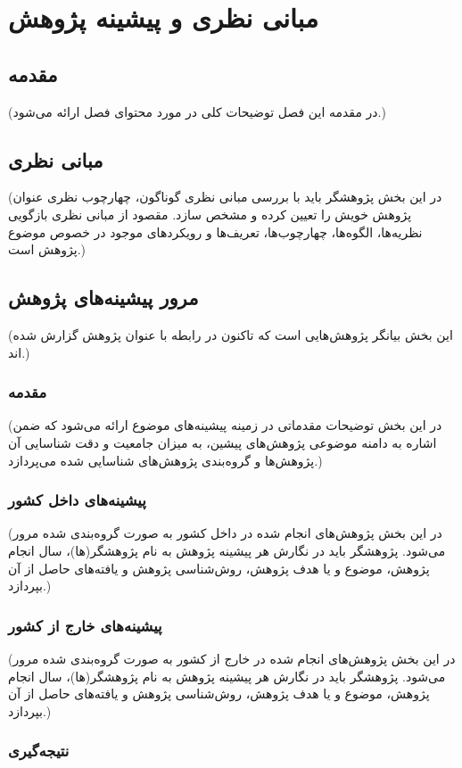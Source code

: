 \chapter{مبانی نظری و پیشینه پژوهش} 

\section{مقدمه}
(در مقدمه این فصل توضیحات کلی در مورد محتوای فصل ارائه می‌شود.) 
\section{مبانی نظری}
(در این بخش پژوهشگر باید با بررسی مبانی نظری گوناگون، چهارچوب نظری عنوان پژوهش خویش را تعیین کرده و مشخص سازد. مقصود از مبانی نظری بازگویی نظریه‌ها، الگوه‌ها، چهارچوب‌ها، تعریف‌ها و رویکردهای موجود در خصوص موضوع پژوهش است.)
\section{مرور پیشینه‌های پژوهش}
(این بخش بیانگر پژوهش‌هایی است که تاکنون در رابطه با عنوان پژوهش گزارش شده اند.)
\subsection{مقدمه}
(در این بخش توضیحات مقدماتی در زمینه پیشینه‌های موضوع ارائه می‌شود که ضمن اشاره به دامنه موضوعی پژوهش‌های پیشین، به میزان جامعیت و دقت شناسایی آن پژوهش‌ها و گروه‌بندی پژوهش‌های شناسایی شده می‌پردازد.)
\subsection{پیشینه‌های داخل کشور}
(در این بخش پژوهش‌های انجام شده در داخل کشور به صورت گروه‌بندی شده مرور می‌شود. پژوهشگر باید در نگارش هر پیشینه پژوهش به نام پژوهشگر(ها)، سال انجام پژوهش، موضوع و یا هدف پژوهش، روش‌شناسی پژوهش و یافته‌های حاصل از آن بپردازد.)
\subsection{پیشینه‌های خارج از کشور}
(در این بخش پژوهش‌های انجام شده در خارج از کشور به صورت گروه‌بندی شده مرور می‌شود. پژوهشگر باید در نگارش هر پیشینه پژوهش به نام پژوهشگر(ها)، سال انجام پژوهش، موضوع و یا هدف پژوهش، روش‌شناسی پژوهش و یافته‌های حاصل از آن بپردازد.)
\subsection{نتیجه‌‌گیری}
